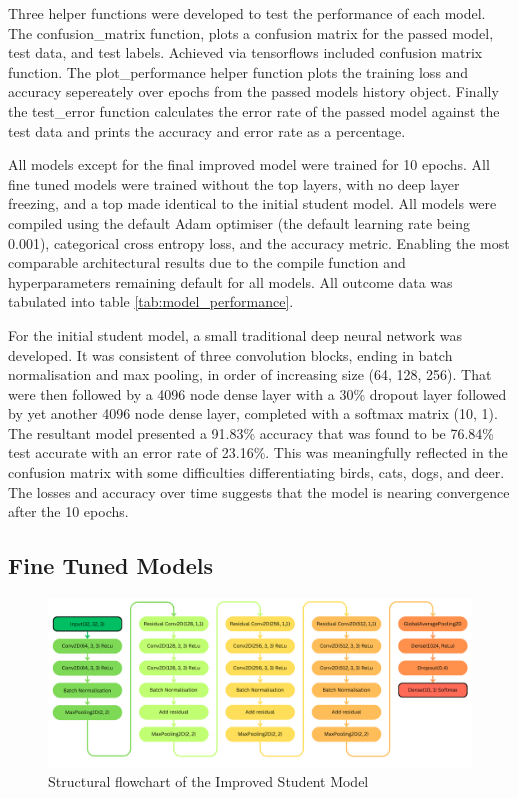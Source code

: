 \documentclass[10pt,twocolumn,letterpaper]{article}
\begin{document}
Three helper functions were developed to test the performance of each model. The confusion\_matrix function, plots a confusion matrix for the passed model, test data, and test labels. Achieved via tensorflows included confusion matrix function. The plot\_performance helper function plots the training loss and accuracy sepereately over epochs from the passed models history object. Finally the test\_error function calculates the error rate of the passed model against the test data and prints the accuracy and error rate as a percentage. 

All models except for the final improved model were trained for 10 epochs. All fine tuned models were trained without the top layers, with no deep layer freezing, and a top made identical to the initial student model. All models were compiled using the default Adam optimiser (the default learning rate being 0.001), categorical cross entropy loss, and the accuracy metric. Enabling the most comparable architectural results due to the compile function and hyperparameters remaining default for all models. All outcome data was tabulated into table \ref{tab:model_performance}.

For the initial student model, a small traditional deep neural network was developed. It was consistent of three convolution blocks, ending in batch normalisation and max pooling, in order of increasing size (64, 128, 256). That were then followed by a 4096 node dense layer with a 30\% dropout layer followed by yet another 4096 node dense layer, completed with a softmax matrix (10, 1). The resultant model presented a 91.83\% accuracy that was found to be 76.84\% test accurate with an error rate of 23.16\%. This was meaningfully reflected in the confusion matrix with some difficulties differentiating birds, cats, dogs, and deer. The losses and accuracy over time suggests that the model is nearing convergence after the 10 epochs. 

\subsection{Fine Tuned Models}

\begin{figure}[t]
    \centering
    \includegraphics[width=\textwidth, height=0.3\textheight]{improved student model diagram croppped.png}
    \caption{Structural flowchart of the Improved Student Model}
    \label{fig:improved model}
\end{figure}
\end{document}
